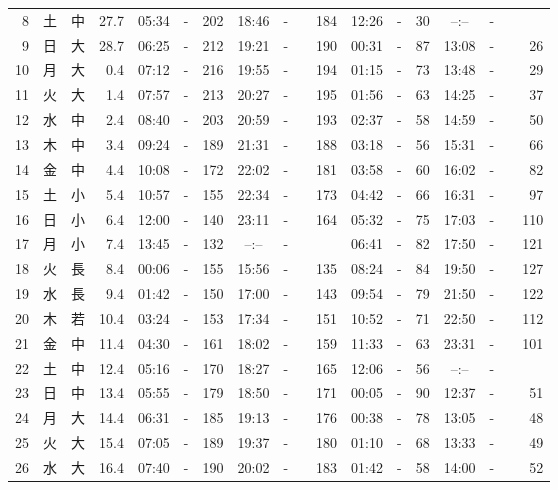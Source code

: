\documentclass[12pt.a4j]{jsarticle}
\begin{document}
\begin{center}
\begin{table}[ht]
\begin{tabular}{|rc|cr|ccrccr|ccrccr|}
 8 & 土 & 中 & 27.7 &  05:34 &-& 202  &  18:46 &-& 184  &   12:26 &-&  30  &   --:-- &-&~~~~~ \\
 9 & 日 & 大 & 28.7 &  06:25 &-& 212  &  19:21 &-& 190  &   00:31 &-&  87  &   13:08 &-&  26  \\
10 & 月 & 大 &  0.4 &  07:12 &-& 216  &  19:55 &-& 194  &   01:15 &-&  73  &   13:48 &-&  29  \\
11 & 火 & 大 &  1.4 &  07:57 &-& 213  &  20:27 &-& 195  &   01:56 &-&  63  &   14:25 &-&  37  \\
12 & 水 & 中 &  2.4 &  08:40 &-& 203  &  20:59 &-& 193  &   02:37 &-&  58  &   14:59 &-&  50  \\
13 & 木 & 中 &  3.4 &  09:24 &-& 189  &  21:31 &-& 188  &   03:18 &-&  56  &   15:31 &-&  66  \\
14 & 金 & 中 &  4.4 &  10:08 &-& 172  &  22:02 &-& 181  &   03:58 &-&  60  &   16:02 &-&  82  \\
15 & 土 & 小 &  5.4 &  10:57 &-& 155  &  22:34 &-& 173  &   04:42 &-&  66  &   16:31 &-&  97  \\
16 & 日 & 小 &  6.4 &  12:00 &-& 140  &  23:11 &-& 164  &   05:32 &-&  75  &   17:03 &-& 110  \\
17 & 月 & 小 &  7.4 &  13:45 &-& 132  &  --:-- &-&~~~~~ &   06:41 &-&  82  &   17:50 &-& 121  \\
18 & 火 & 長 &  8.4 &  00:06 &-& 155  &  15:56 &-& 135  &   08:24 &-&  84  &   19:50 &-& 127  \\
19 & 水 & 長 &  9.4 &  01:42 &-& 150  &  17:00 &-& 143  &   09:54 &-&  79  &   21:50 &-& 122  \\
20 & 木 & 若 & 10.4 &  03:24 &-& 153  &  17:34 &-& 151  &   10:52 &-&  71  &   22:50 &-& 112  \\
21 & 金 & 中 & 11.4 &  04:30 &-& 161  &  18:02 &-& 159  &   11:33 &-&  63  &   23:31 &-& 101  \\
22 & 土 & 中 & 12.4 &  05:16 &-& 170  &  18:27 &-& 165  &   12:06 &-&  56  &   --:-- &-&~~~~~ \\
23 & 日 & 中 & 13.4 &  05:55 &-& 179  &  18:50 &-& 171  &   00:05 &-&  90  &   12:37 &-&  51  \\
24 & 月 & 大 & 14.4 &  06:31 &-& 185  &  19:13 &-& 176  &   00:38 &-&  78  &   13:05 &-&  48  \\
25 & 火 & 大 & 15.4 &  07:05 &-& 189  &  19:37 &-& 180  &   01:10 &-&  68  &   13:33 &-&  49  \\
26 & 水 & 大 & 16.4 &  07:40 &-& 190  &  20:02 &-& 183  &   01:42 &-&  58  &   14:00 &-&  52  \\

\end{tabular}
\end{table}
\end{center}
\end{document}
